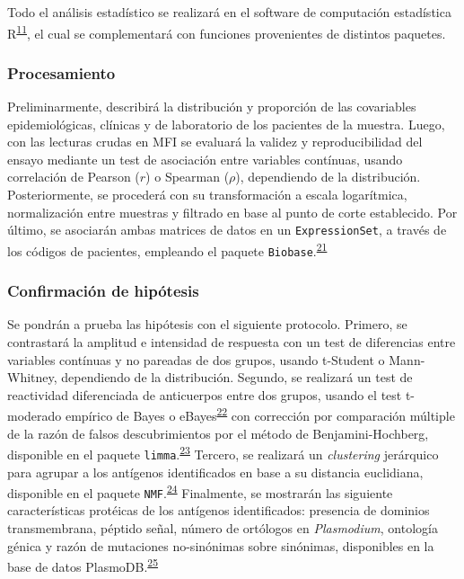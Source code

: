 \documentclass[]{article}
\begin{document}
Todo el análisis estadístico se realizará en el software de computación
estadística R\textsuperscript{\protect\hyperlink{ref-R}{11}}, el cual se
complementará con funciones provenientes de distintos paquetes.

\subsubsection{Procesamiento}\label{procesamiento}

Preliminarmente, describirá la distribución y proporción de las
covariables epidemiológicas, clínicas y de laboratorio de los pacientes
de la muestra. Luego, con las lecturas crudas en MFI se evaluará la
validez y reproducibilidad del ensayo mediante un test de asociación
entre variables contínuas, usando correlación de Pearson (\(r\)) o
Spearman (\(\rho\)), dependiendo de la distribución. Posteriormente, se
procederá con su transformación a escala logarítmica, normalización
entre muestras y filtrado en base al punto de corte establecido. Por
último, se asociarán ambas matrices de datos en un
\texttt{ExpressionSet}, a través de los códigos de pacientes, empleando
el paquete
\texttt{Biobase}.\textsuperscript{\protect\hyperlink{ref-Biobase}{21}}

\subsubsection{Confirmación de
hipótesis}\label{confirmacion-de-hipotesis}

Se pondrán a prueba las hipótesis con el siguiente protocolo. Primero,
se contrastará la amplitud e intensidad de respuesta con un test de
diferencias entre variables contínuas y no pareadas de dos grupos,
usando t-Student o Mann-Whitney, dependiendo de la distribución.
Segundo, se realizará un test de reactividad diferenciada de anticuerpos
entre dos grupos, usando el test t-moderado empírico de Bayes o
eBayes\textsuperscript{\protect\hyperlink{ref-smyth2004ebayes}{22}} con
corrección por comparación múltiple de la razón de falsos
descubrimientos por el método de Benjamini-Hochberg, disponible en el
paquete
\texttt{limma}.\textsuperscript{\protect\hyperlink{ref-limma}{23}}
Tercero, se realizará un \emph{clustering} jerárquico para agrupar a los
antígenos identificados en base a su distancia euclidiana, disponible en
el paquete
\texttt{NMF}.\textsuperscript{\protect\hyperlink{ref-Gaujoux2010NMF}{24}}
Finalmente, se mostrarán las siguiente características protéicas de los
antígenos identificados: presencia de dominios transmembrana, péptido
señal, número de ortólogos en \emph{Plasmodium}, ontología génica y
razón de mutaciones no-sinónimas sobre sinónimas, disponibles en la base
de datos PlasmoDB.\textsuperscript{\protect\hyperlink{ref-plasmodb}{25}}
\end{document}
